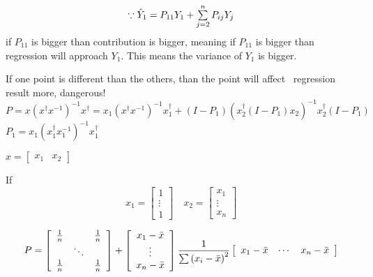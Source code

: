 \documentclass{article}
\begin{document}
\bigskip

\begin{equation*}
\because \hat{Y}_{1}=P_{11}Y_{1}+\mathop{\textstyle \sum }\limits_{j=2}^{n}P_{ij}Y_{j}
\end{equation*}%
if $P_{11}$ is bigger than contribution is bigger, meaning if $P_{11}$ is
bigger than regression will approach $Y_{1}$. This means the variance of $%
Y_{1}$ is bigger.

If one point is different than the others, than the point will affect \
regression result more, dangerous!%
\begin{equation*}
P=x\left( x^{\dagger }x^{-1}\right) ^{-1}x^{\dagger }=x_{1}\left( x^{\dagger
}x^{-1}\right) ^{-1}x_{1}^{\dagger }+\left( I-P_{1}\right) \left(
x_{2}^{\dagger }\left( I-P_{1}\right) x_{2}\right) ^{-1}x_{2}^{\dagger
}\left( I-P_{1}\right)
\end{equation*}%
$P_{1}=x_{1}\left( x_{1}^{\dagger }x_{1}^{-1}\right) ^{-1}x_{1}^{\dagger }$

\bigskip

$x=\left[ 
\begin{array}{cc}
x_{1} & x_{2}%
\end{array}%
\right] $

If%
\begin{equation*}
x_{1}=\left[ 
\begin{array}{c}
1 \\ 
\vdots \\ 
1%
\end{array}%
\right] \quad x_{2}=\left[ 
\begin{array}{c}
x_{1} \\ 
\vdots \\ 
x_{n}%
\end{array}%
\right]
\end{equation*}

\begin{equation*}
P=\left[ 
\begin{array}{ccc}
\frac{1}{n} &  & \frac{1}{n} \\ 
& \ddots &  \\ 
\frac{1}{n} &  & \frac{1}{n}%
\end{array}%
\right] +\left[ 
\begin{array}{c}
x_{1}-\bar{x} \\ 
\vdots \\ 
x_{n}-\bar{x}%
\end{array}%
\right] \frac{1}{\tsum \left( x_{i}-\bar{x}\right) ^{2}}\left[ 
\begin{array}{ccc}
x_{1}-\bar{x} & \cdots & x_{n}-\bar{x}%
\end{array}%
\right]
\end{equation*}
\end{document}
